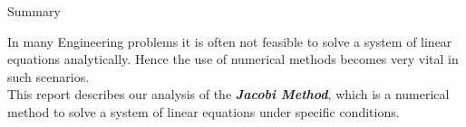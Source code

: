 \documentclass[main.tex]{subfiles}
\begin{document}
\vspace*{\fill}

{\Huge Summary\\}

    In many Engineering problems it is often not feasible to solve a system of linear 
    equations analytically. Hence the use of numerical methods becomes very vital in such scenarios.\vspace{0.5mm}\\ 
    
    This report describes our analysis of the \textbf{\textit{Jacobi Method}}, which is a numerical method to solve 
    a system of linear equations under specific conditions.
\vspace*{\fill}
    
\clearpage
\end{document}
